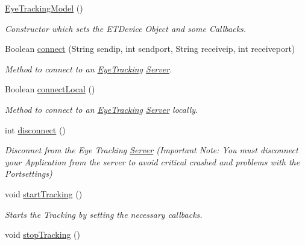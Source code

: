 \begin{DoxyCompactItemize}
\item 
\hyperlink{class_web_analyzer_1_1_eye_tracking_1_1_eye_tracking_model_a6be62a4dc74db08b88c80aa8603a06e2}{Eye\+Tracking\+Model} ()
\begin{DoxyCompactList}\small\item\em Constructor which sets the E\+T\+Device Object and some Callbacks. \end{DoxyCompactList}\item 
Boolean \hyperlink{class_web_analyzer_1_1_eye_tracking_1_1_eye_tracking_model_a6e9342c234b6000ba68c03464acb0f50}{connect} (String sendip, int sendport, String receiveip, int receiveport)
\begin{DoxyCompactList}\small\item\em Method to connect to an \hyperlink{namespace_web_analyzer_1_1_eye_tracking}{Eye\+Tracking} \hyperlink{namespace_web_analyzer_1_1_server}{Server}. \end{DoxyCompactList}\item 
Boolean \hyperlink{class_web_analyzer_1_1_eye_tracking_1_1_eye_tracking_model_a95814ec9f1a4f0d5da70a78c50dd9e22}{connect\+Local} ()
\begin{DoxyCompactList}\small\item\em Method to connect to an \hyperlink{namespace_web_analyzer_1_1_eye_tracking}{Eye\+Tracking} \hyperlink{namespace_web_analyzer_1_1_server}{Server} locally. \end{DoxyCompactList}\item 
int \hyperlink{class_web_analyzer_1_1_eye_tracking_1_1_eye_tracking_model_ac340062e8376b59332ecc21e431fd6a1}{disconnect} ()
\begin{DoxyCompactList}\small\item\em Disconnet from the Eye Tracking \hyperlink{namespace_web_analyzer_1_1_server}{Server} (Important Note\+: You must disconnect your Application from the server to avoid critical crashed and problems with the Portsettings) \end{DoxyCompactList}\item 
void \hyperlink{class_web_analyzer_1_1_eye_tracking_1_1_eye_tracking_model_a5f49386b161f435472133e2d1f4762e0}{start\+Tracking} ()
\begin{DoxyCompactList}\small\item\em Starts the Tracking by setting the necessary callbacks. \end{DoxyCompactList}\item 
void \hyperlink{class_web_analyzer_1_1_eye_tracking_1_1_eye_tracking_model_aef3a60c497edbedc9fe8b350f46696b1}{stop\+Tracking} ()

\end{DoxyCompactItemize}
